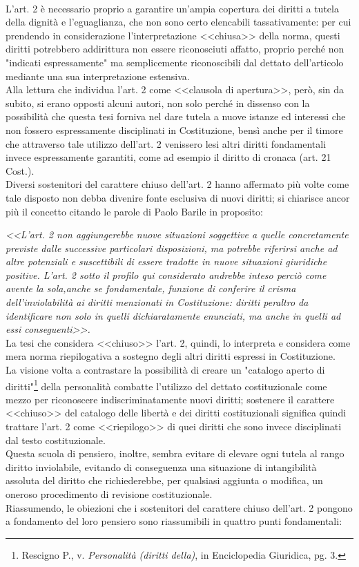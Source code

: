 \\L'art. 2 è necessario proprio a garantire un'ampia copertura dei diritti a tutela della dignità e l'eguaglianza, che non sono certo elencabili tassativamente: per cui prendendo in considerazione l'interpretazione <<chiusa>> della norma, questi diritti potrebbero addirittura non essere riconosciuti affatto, proprio perché non "indicati espressamente" ma semplicemente riconoscibili dal dettato dell'articolo mediante una sua interpretazione estensiva. 
\\Alla lettura che individua l'art. 2 come <<clausola di apertura>>, però, sin da subito, si erano opposti alcuni autori, non solo perché in dissenso con la possibilità che questa tesi forniva nel dare tutela a nuove istanze ed interessi che non fossero espressamente disciplinati in Costituzione,  bensì anche per il timore che attraverso tale utilizzo dell’art. 2 venissero lesi altri diritti fondamentali  invece espressamente garantiti, come ad esempio il diritto di cronaca (art. 21 Cost.).
\\Diversi sostenitori del carattere chiuso dell'art. 2 hanno affermato più volte come tale disposto non debba divenire fonte esclusiva di nuovi diritti; si chiarisce ancor più il concetto citando le parole di Paolo Barile in proposito: 

\textit{<<L’art. 2 non aggiungerebbe nuove situazioni soggettive a quelle concretamente previste dalle successive particolari disposizioni, ma potrebbe riferirsi anche ad altre potenziali e suscettibili di essere tradotte in nuove situazioni giuridiche positive. L’art. 2 sotto il profilo qui considerato andrebbe inteso perciò come avente la sola,anche se fondamentale, funzione di conferire il crisma dell’inviolabilità ai diritti menzionati in Costituzione: diritti peraltro da identificare non solo in quelli dichiaratamente enunciati, ma anche in quelli ad essi conseguenti>>.} 
\\La tesi che considera <<chiuso>> l'art. 2, quindi, lo interpreta e considera come mera norma riepilogativa a sostegno degli altri diritti espressi in Costituzione. 
\\La visione volta a contrastare la possibilità di creare un "catalogo aperto di diritti"\footnote{Rescigno P., v. \textit{Personalità (diritti della)}, in Enciclopedia Giuridica, pg. 3.} della personalità combatte l'utilizzo del dettato costituzionale come mezzo per riconoscere indiscriminatamente nuovi diritti; sostenere il carattere <<chiuso>> del catalogo delle  libertà e dei diritti costituzionali significa quindi trattare l'art. 2 come <<riepilogo>> di quei diritti che sono invece disciplinati dal testo costituzionale. 
\\Questa scuola di pensiero, inoltre, sembra evitare di elevare ogni tutela al rango diritto inviolabile, evitando di conseguenza una situazione di intangibilità assoluta del diritto che richiederebbe, per qualsiasi aggiunta o modifica, un oneroso procedimento di revisione costituzionale.
\\Riassumendo, le obiezioni che i sostenitori del carattere chiuso dell'art. 2 pongono a fondamento del loro pensiero sono riassumibili in quattro punti fondamentali:

